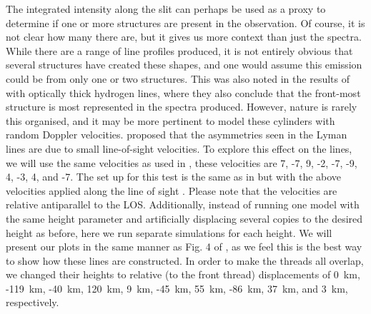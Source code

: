 The integrated intensity along the slit can perhaps be used as a proxy to determine if one or more structures are present in the observation. Of course, it is not clear how many there are, but it gives us more context than just the spectra. While there are a range of line profiles produced, it is not entirely obvious that several structures have created these shapes, and one would assume this emission could be from only one or two structures. This was also noted in the results of \cite{labrosse_radiative_2016} with optically thick hydrogen lines, where they also conclude that the front-most structure is most represented in the spectra produced. However, nature is rarely this organised, and it may be more pertinent to model these cylinders with random Doppler velocities. \cite{gunar_lyman-line_2008} proposed that the asymmetries seen in the Lyman lines are due to small line-of-sight velocities. To explore this effect on the \mgiihk{} lines, we will use the same velocities as used in \cite{labrosse_radiative_2016}, these velocities are 7, -7, 9, -2, -7, -9, 4, -3, 4, and -7\kms. The set up for this test is the same as in  but with the above velocities applied along the line of sight . Please note that the velocities are relative antiparallel to the LOS. Additionally, instead of running one model with the same height parameter and artificially displacing several copies to the desired height as before, here we run separate simulations for each height. We will present our plots in the same manner as Fig. 4 of \cite{gunar_lyman-line_2008}, as we feel this is the best way to show how these lines are constructed. In order to make the threads all overlap, we changed their heights to relative (to the front thread) displacements of 0~km, -119~km, -40~km, 120~km, 9~km, -45~km, 55~km, -86~km, 37~km, and 3~km, respectively.
